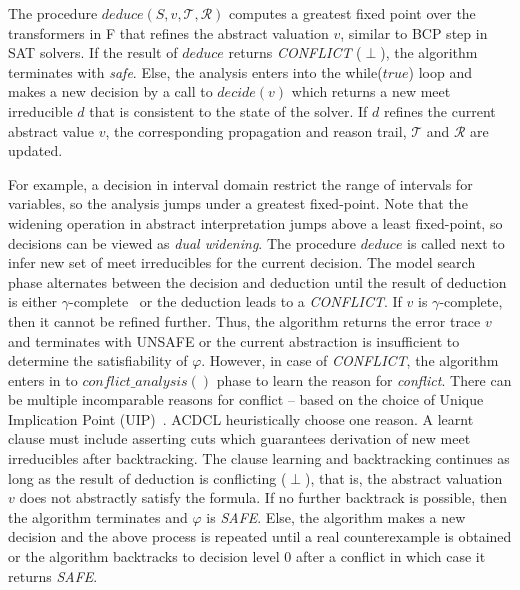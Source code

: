 The procedure $deduce(S,v,\mathcal{T},\mathcal{R})$ computes a greatest 
fixed point over the transformers in F that refines the abstract valuation 
$v$, similar to BCP step in SAT solvers.  If the result of $deduce$ 
returns {\em CONFLICT} ($\perp$), the algorithm terminates with {\em safe}. 
Else, the analysis enters into the while($true$) loop and makes a new decision 
by a call to $decide(v)$ which returns a new meet irreducible $d$ that is
consistent to the state of the solver.  If $d$ refines the current abstract 
value $v$, the corresponding propagation and reason trail, $\mathcal{T}$ 
and $\mathcal{R}$ are updated. 

For example, a decision in interval domain restrict the range of 
intervals for variables, so the analysis jumps under a 
greatest fixed-point. Note that the widening operation in abstract interpretation 
jumps above a least fixed-point, so decisions can be viewed as 
{\em dual widening}.  The procedure $deduce$ is called next to infer new 
set of meet irreducibles for the current decision.  The model search phase 
alternates between the decision and deduction until the result of deduction 
is either $\gamma$-complete~\cite{gamma} or the deduction leads to a {\em CONFLICT}.  
If $v$ is $\gamma$-complete, then it cannot be refined further.  Thus, the 
algorithm returns the error trace $v$ and terminates with UNSAFE or the 
current abstraction is insufficient to determine the satisfiability of $\varphi$.  
However, in case of {\em CONFLICT}, the algorithm enters in to 
$conflict\_analysis()$ phase to learn the reason for {\em conflict}.  
There can be multiple incomparable reasons for conflict -- based on 
the choice of Unique Implication Point (UIP)~\cite{cdcl}.  ACDCL heuristically 
choose one reason.  A learnt clause must include asserting cuts which 
guarantees derivation of new meet irreducibles after backtracking. The clause 
learning and backtracking continues as long as the result of deduction 
is conflicting ($\perp$), that is, the abstract valuation $v$ does not
abstractly satisfy the formula.  If no further backtrack is possible, 
then the algorithm terminates and $\varphi$ is {\em SAFE}. Else, the 
algorithm makes a new decision and the above process is repeated 
until a real counterexample is obtained or the algorithm backtracks to 
decision level 0 after a conflict in which case it returns {\em SAFE}. 

